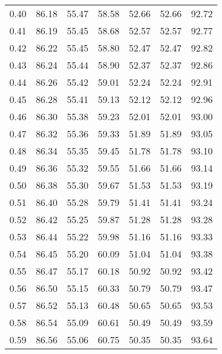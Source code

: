\begin{tabular}{|c|c|c|c|c|c|c|}
      0.40 &     86.18 &     55.47 &      58.58 &   52.66 &      52.66 &         92.72 \\
      0.41 &     86.19 &     55.45 &      58.68 &   52.57 &      52.57 &         92.77 \\
      0.42 &     86.22 &     55.45 &      58.80 &   52.47 &      52.47 &         92.82 \\
      0.43 &     86.24 &     55.44 &      58.90 &   52.37 &      52.37 &         92.86 \\
      0.44 &     86.26 &     55.42 &      59.01 &   52.24 &      52.24 &         92.91 \\
      0.45 &     86.28 &     55.41 &      59.13 &   52.12 &      52.12 &         92.96 \\
      0.46 &     86.30 &     55.38 &      59.23 &   52.01 &      52.01 &         93.00 \\
      0.47 &     86.32 &     55.36 &      59.33 &   51.89 &      51.89 &         93.05 \\
      0.48 &     86.34 &     55.35 &      59.45 &   51.78 &      51.78 &         93.10 \\
      0.49 &     86.36 &     55.32 &      59.55 &   51.66 &      51.66 &         93.14 \\
      0.50 &     86.38 &     55.30 &      59.67 &   51.53 &      51.53 &         93.19 \\
      0.51 &     86.40 &     55.28 &      59.79 &   51.41 &      51.41 &         93.24 \\
      0.52 &     86.42 &     55.25 &      59.87 &   51.28 &      51.28 &         93.28 \\
      0.53 &     86.44 &     55.22 &      59.98 &   51.16 &      51.16 &         93.33 \\
      0.54 &     86.45 &     55.20 &      60.09 &   51.04 &      51.04 &         93.38 \\
      0.55 &     86.47 &     55.17 &      60.18 &   50.92 &      50.92 &         93.42 \\
      0.56 &     86.50 &     55.15 &      60.33 &   50.79 &      50.79 &         93.47 \\
      0.57 &     86.52 &     55.13 &      60.48 &   50.65 &      50.65 &         93.53 \\
      0.58 &     86.54 &     55.09 &      60.61 &   50.49 &      50.49 &         93.59 \\
      0.59 &     86.56 &     55.06 &      60.75 &   50.35 &      50.35 &         93.64 \\

\end{tabular}

